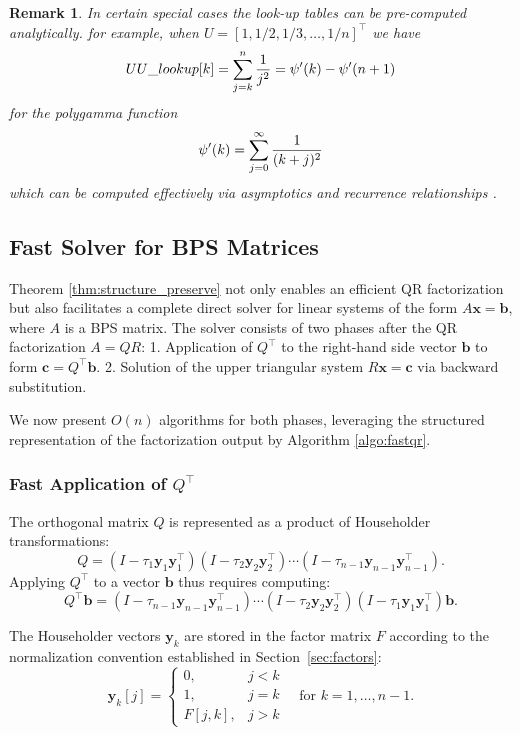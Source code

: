 \documentclass[a4paper,fleqn]{cas-sc}
\def\bfy{{\mathbf y}}
\newtheorem{remark}{Remark}[section]
\begin{document}
\begin{remark}
    In certain special cases the look-up tables can be pre-computed analytically. for example, when $U = [1, 1/2, 1/3, \dots, 1/n]^\top$ we have
\[
UU\_lookup[k] = \sum_{j=k}^n {1 \over j^2} = \psi'(k)-\psi'(n+1)
\]
for the polygamma function \cite[5.15]{OlverNIST}
\[
\psi'(k) = \sum_{j=0}^\infty {1\over (k+j)^2}
\]
which can be computed effectively via asymptotics and recurrence relationships \cite[5.12]{OlverNIST}.
\end{remark}


\subsection{Fast Solver for BPS Matrices}
\label{sec:solver}

Theorem \ref{thm:structure_preserve} not only enables an efficient QR factorization but also facilitates a complete direct solver for linear systems of the form \( A\mathbf{x} = \mathbf{b} \), where \( A \) is a BPS matrix. The solver consists of two phases after the QR factorization \( A = QR \):
1. Application of \( Q^\top \) to the right-hand side vector \( \mathbf{b} \) to form \( \mathbf{c} = Q^\top \mathbf{b} \).
2. Solution of the upper triangular system \( R\mathbf{x} = \mathbf{c} \) via backward substitution.

We now present \( O(n) \) algorithms for both phases, leveraging the structured representation of the factorization output by Algorithm \ref{algo:fastqr}.

\subsubsection{Fast Application of \( Q^\top \)}

The orthogonal matrix \( Q \) is represented as a product of Householder transformations:
\[
Q = (I - \tau_1 \bfy_1 \bfy_1^\top)(I - \tau_2 \bfy_2 \bfy_2^\top) \cdots (I - \tau_{n-1} \bfy_{n-1} \bfy_{n-1}^\top).
\]
Applying \( Q^\top \) to a vector \( \mathbf{b} \) thus requires computing:
\[
Q^\top\mathbf{b} = (I - \tau_{n-1} \bfy_{n-1} \bfy_{n-1}^\top) \cdots (I - \tau_2 \bfy_2 \bfy_2^\top)(I - \tau_1 \bfy_1 \bfy_1^\top)\mathbf{b}.
\]

The Householder vectors \( \bfy_k \) are stored in the factor matrix \( F \) according to the normalization convention established in Section~\ref{sec:factors}:
\[
\bfy_k[j] =
\begin{cases}
0, & j < k \\
1, & j = k \\
F[j,k], & j > k
\end{cases}
\quad \text{for } k = 1, \ldots, n-1.
\]
\end{document}
